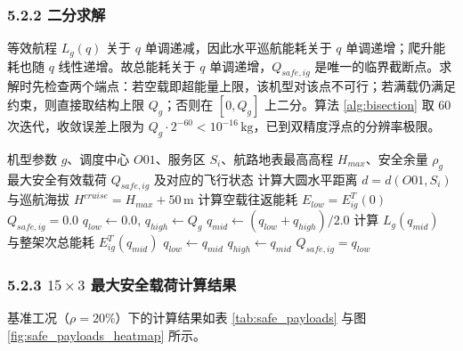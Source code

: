 \documentclass[withoutpreface,bwprint]{format}
\begin{document}
\subsubsection{5.2.2 二分求解}
等效航程 $L_g(q)$ 关于 $q$ 单调递减，因此水平巡航能耗关于 $q$ 单调递增；爬升能耗也随 $q$ 线性递增。故总能耗关于 $q$ 单调递增，$Q_{safe,ig}$ 是唯一的临界截断点。求解时先检查两个端点：若空载即超能量上限，该机型对该点不可行；若满载仍满足约束，则直接取结构上限 $Q_g$；否则在 $[0, Q_g]$ 上二分。算法 \ref{alg:bisection} 取 60 次迭代，收敛误差上限为 $Q_g \cdot 2^{-60} < 10^{-16}\,\text{kg}$，已到双精度浮点的分辨率极限。

\begin{algorithm}[H]
\caption{基于能耗二分搜索的最大安全载荷求解}
\label{alg:bisection}
\begin{algorithmic}[1]
\Require 机型参数 $g$、调度中心 $O01$、服务区 $S_i$、航路地表最高高程 $H_{max}$、安全余量 $\rho_g$
\Ensure 最大安全有效载荷 $Q_{safe, ig}$ 及对应的飞行状态
\State 计算大圆水平距离 $d = d(O01, S_i)$ 与巡航海拔 $H^{cruise} = H_{max} + 50\,\text{m}$
\State 计算空载往返能耗 $E_{low} = E_{ig}^T(0)$
    \State \Return $Q_{safe, ig} = 0.0$ 
\EndIf
\State $q_{low} \gets 0.0$, $q_{high} \gets Q_g$
    \State $q_{mid} \gets (q_{low} + q_{high}) / 2.0$
    \State 计算 $L_g(q_{mid})$ 与整架次总能耗 $E_{ig}^T(q_{mid})$
        \State $q_{low} \gets q_{mid}$ 
    \Else
        \State $q_{high} \gets q_{mid}$ 
    \EndIf
\EndFor
\State \Return $Q_{safe, ig} = q_{low}$
\end{algorithmic}
\end{algorithm}

\subsubsection{\texorpdfstring{5.2.3 $15\times 3$ 最大安全载荷计算结果}{5.2.3 15x3 最大安全载荷计算结果}}
基准工况（$\rho=20\%$）下的计算结果如表 \ref{tab:safe_payloads} 与图 \ref{fig:safe_payloads_heatmap} 所示。
\end{document}
